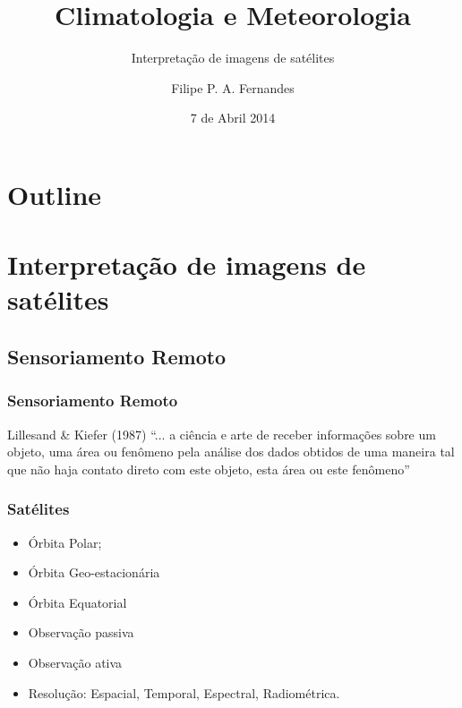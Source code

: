 \title[Aula 08]{Climatologia e Meteorologia}
\subtitle{Interpretação de imagens de satélites}
\author[Filipe Fernandes]{Filipe P. A. Fernandes}
\date[Abril 2014]{7 de Abril 2014}




\begin{frame}[plain]
  \titlepage
\end{frame}

\section*{Outline}
\begin{frame}
\tableofcontents
\end{frame}

\section{Interpretação de imagens de satélites}

\subsection{Sensoriamento Remoto}

\begin{frame}
\frametitle{Sensoriamento Remoto}
  \begin{block}{Lillesand \& Kiefer (1987)}
    ``... a ciência e arte de receber informações sobre um objeto, uma área ou
    fenômeno pela análise dos dados obtidos de uma maneira tal que não
    haja contato direto com este objeto, esta área ou este fenômeno''
  \end{block}

\end{frame}

\begin{frame}
\frametitle{Satélites}
  \begin{itemize}[<+-| alert@+>]
    \item Órbita Polar;
    \item Órbita Geo-estacionária
    \item Órbita Equatorial
    \item Observação passiva
    \item Observação ativa
    \item Resolução: Espacial, Temporal, Espectral, Radiométrica.
  \end{itemize}
\end{frame}

